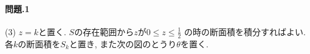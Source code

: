 \documentclass[11pt]{jarticle}
\begin{document}
\title{}
\date{}
\maketitle
\paragraph{問題.1}
(3) $z=k$と置く. $S$の存在範囲から$z$が$0\leq z \leq \frac{1}{2}$
の時の断面積を積分すればよい. 各$k$の断面積を$S_k$と置き, また次の図のとうり$\theta$を置く.
\end{document}
